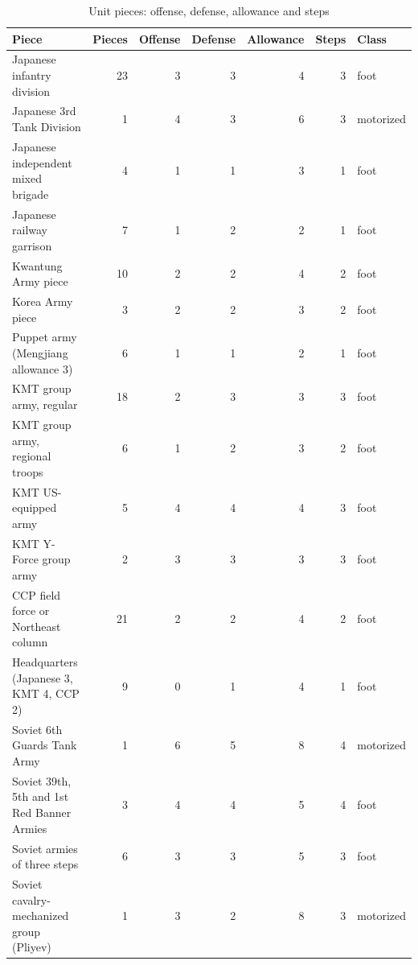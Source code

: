 \documentclass[11pt]{article}
\begin{document}
\begin{table}[ht]
\centering\small
\begin{tabular}{@{}lrrrrrl@{}}
\toprule
Piece & Pieces & Offense & Defense & Allowance & Steps & Class \\
\midrule
Japanese infantry division & 23 & 3 & 3 & 4 & 3 & foot \\
Japanese 3rd Tank Division & 1 & 4 & 3 & 6 & 3 & motorized \\
Japanese independent mixed brigade & 4 & 1 & 1 & 3 & 1 & foot \\
Japanese railway garrison & 7 & 1 & 2 & 2 & 1 & foot \\
Kwantung Army piece & 10 & 2 & 2 & 4 & 2 & foot \\
Korea Army piece & 3 & 2 & 2 & 3 & 2 & foot \\
Puppet army (Mengjiang allowance 3) & 6 & 1 & 1 & 2 & 1 & foot \\
KMT group army, regular & 18 & 2 & 3 & 3 & 3 & foot \\
KMT group army, regional troops & 6 & 1 & 2 & 3 & 2 & foot \\
KMT US-equipped army & 5 & 4 & 4 & 4 & 3 & foot \\
KMT Y-Force group army & 2 & 3 & 3 & 3 & 3 & foot \\
CCP field force or Northeast column & 21 & 2 & 2 & 4 & 2 & foot \\
Headquarters (Japanese 3, KMT 4, CCP 2) & 9 & 0 & 1 & 4 & 1 & foot \\
Soviet 6th Guards Tank Army & 1 & 6 & 5 & 8 & 4 & motorized \\
Soviet 39th, 5th and 1st Red Banner Armies & 3 & 4 & 4 & 5 & 4 & foot \\
Soviet armies of three steps & 6 & 3 & 3 & 5 & 3 & foot \\
Soviet cavalry-mechanized group (Pliyev) & 1 & 3 & 2 & 8 & 3 & motorized \\
\bottomrule
\end{tabular}
\caption{Unit pieces: offense, defense, allowance and steps}\label{tab:pieces}
\end{table}
\end{document}
